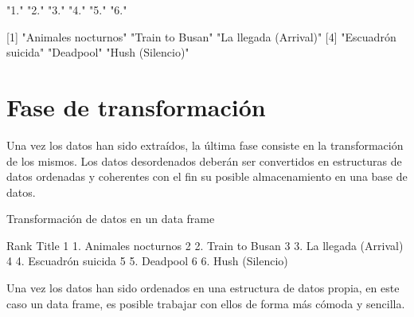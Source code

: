 \begin{Schunk}
    \begin{Soutput}
    [1] "1." "2." "3." "4." "5." "6."
    
    [1] "Animales nocturnos"   "Train to Busan"       "La llegada (Arrival)"
    [4] "Escuadrón suicida"    "Deadpool"             "Hush (Silencio)"     
    \end{Soutput}
\end{Schunk}
    

\section{Fase de transformación}
\label{sec:fase de transformacion}

Una vez los datos han sido extraídos, la última fase consiste en la transformación de los mismos. Los datos
desordenados deberán ser convertidos en estructuras de datos ordenadas y coherentes con el fin su posible
almacenamiento en una base de datos.

\begin{codefloat}

\caption{Transformación de datos en un data frame}
\label{cod:transformacion de datos en un data frame}
\end{codefloat}

\begin{Schunk}
    \begin{Soutput}
      Rank                Title
    1   1.   Animales nocturnos
    2   2.       Train to Busan
    3   3. La llegada (Arrival)
    4   4.    Escuadrón suicida
    5   5.             Deadpool
    6   6.      Hush (Silencio)
    \end{Soutput}
\end{Schunk}

Una vez los datos han sido ordenados en una estructura de datos propia, en este caso un data frame, es
posible trabajar con ellos de forma más cómoda y sencilla.







